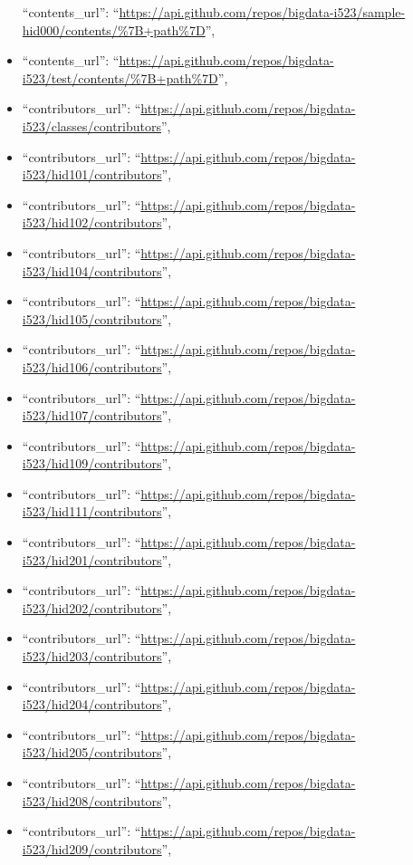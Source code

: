 \begin{itemize}
  ``contents\_url'':
  ``\url{https://api.github.com/repos/bigdata-i523/sample-hid000/contents/\%7B+path\%7D}'',
\item
  ``contents\_url'':
  ``\url{https://api.github.com/repos/bigdata-i523/test/contents/\%7B+path\%7D}'',
\item
  ``contributors\_url'':
  ``\url{https://api.github.com/repos/bigdata-i523/classes/contributors}'',
\item
  ``contributors\_url'':
  ``\url{https://api.github.com/repos/bigdata-i523/hid101/contributors}'',
\item
  ``contributors\_url'':
  ``\url{https://api.github.com/repos/bigdata-i523/hid102/contributors}'',
\item
  ``contributors\_url'':
  ``\url{https://api.github.com/repos/bigdata-i523/hid104/contributors}'',
\item
  ``contributors\_url'':
  ``\url{https://api.github.com/repos/bigdata-i523/hid105/contributors}'',
\item
  ``contributors\_url'':
  ``\url{https://api.github.com/repos/bigdata-i523/hid106/contributors}'',
\item
  ``contributors\_url'':
  ``\url{https://api.github.com/repos/bigdata-i523/hid107/contributors}'',
\item
  ``contributors\_url'':
  ``\url{https://api.github.com/repos/bigdata-i523/hid109/contributors}'',
\item
  ``contributors\_url'':
  ``\url{https://api.github.com/repos/bigdata-i523/hid111/contributors}'',
\item
  ``contributors\_url'':
  ``\url{https://api.github.com/repos/bigdata-i523/hid201/contributors}'',
\item
  ``contributors\_url'':
  ``\url{https://api.github.com/repos/bigdata-i523/hid202/contributors}'',
\item
  ``contributors\_url'':
  ``\url{https://api.github.com/repos/bigdata-i523/hid203/contributors}'',
\item
  ``contributors\_url'':
  ``\url{https://api.github.com/repos/bigdata-i523/hid204/contributors}'',
\item
  ``contributors\_url'':
  ``\url{https://api.github.com/repos/bigdata-i523/hid205/contributors}'',
\item
  ``contributors\_url'':
  ``\url{https://api.github.com/repos/bigdata-i523/hid208/contributors}'',
\item
  ``contributors\_url'':
  ``\url{https://api.github.com/repos/bigdata-i523/hid209/contributors}'',

\end{itemize}
